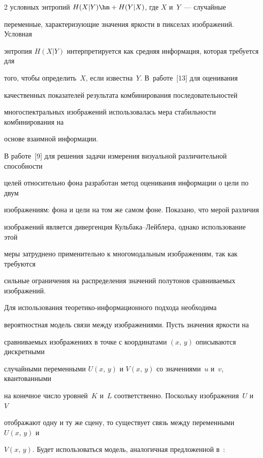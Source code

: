 \begin{multicols}{2}
условных энтропий $H(X\vert Y)\hm+H(Y\vert X)$, где $X$ и~$Y$~--- случайные 


переменные, характеризующие значения яркости в пикселах изображений. Условная 


энтропия $H(X\vert Y)$ интерпретируется как средняя информация, которая требуется для 


того, чтобы определить~$X$, если известна~$Y$. В~работе~[13] для оценивания 


качественных показателей результата комбинирования последовательностей 


многоспектральных изображений использовалась мера стабильности комбинирования на 


основе взаимной информации.


  


  В работе~[9] для решения задачи измерения визуальной различительной способности 


целей относительно фона разработан метод оценивания информации о цели по двум 


изображениям: фона и цели на том же самом фоне. Показано, что мерой различия 


изображений является дивергенция Куль\-ба\-ка--Лейб\-ле\-ра, однако использование этой 


меры затруднено применительно к многомодальным изображениям, так как требуются 


сильные ограничения на распределения значений полутонов сравниваемых изображений. 


  


  Для использования теоретико-ин\-фор\-ма\-ци\-он\-но\-го подхода необходима 


вероятностная модель свя\-зи между изображениями. Пусть значения яр\-кости на 


сравниваемых изображениях в точке с координатами $(x,\,y)$ описываются дискретными 


случай\-ны\-ми переменными $U(x,\,y)$ и $V(x,\,y)$ со значениями~$u$ и~$v$, квантованными 


на конечное число уровней~$K$ и~$L$ соответственно. Поскольку изоб\-ра\-же\-ния~$U$ и~$V$ 


отображают одну и ту же сцену, то существует связь между переменными $U(x,\,y)$ и 


$V(x,\,y)$. Будет использоваться модель, аналогичная предложенной в~\cite{11mur}:


  \begin{equation}



\end{equation}
\end{multicols}

